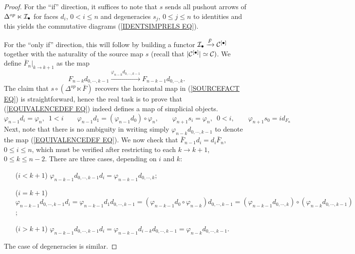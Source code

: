 \documentclass[a4paper,10pt]{article}%
\begin{document}
\begin{proof}
For the ``if'' direction, it suffices to note that $s$ sends all pushout arrows of $\Delta^{op} \ltimes \mathcal{I}_{\bullet}$ for faces $d_i$, $0<i\leq n$ and degeneracies
$s_j$, $0\leq j \leq n$ to identities
and this yields the commutative diagrams (\ref{IDENTSIMPRELS EQ}).

For the ``only if''  direction, this will follow by building a 
functor
$\mathcal{I}_{\bullet} \xrightarrow{\bar{F}} \mathcal{C}^{[\bullet]}$ together with the naturality of the source map $s$ (recall that $|\mathcal{C}^{[\bullet]}|\simeq \mathcal{C})$. We define
$\bar{F}_n|_{k \to k+1}$ as the map
\begin{equation}\label{EQUIVALENCEDEF EQ}
F_{n-k} d_{0,\cdots,k-1}
	\xrightarrow{\varphi_{n-k} d_{0,\cdots,k-1}}
F_{n-k-1} d_{0,\cdots,k}.
\end{equation}
The claim that $s \circ (\Delta^{op} \ltimes \bar{F})$ recovers the horizontal map in (\ref{SOURCEFACT EQ}) is straightforward, hence the real task is to prove that (\ref{EQUIVALENCEDEF EQ}) indeed defines a map of simplicial objects.
\begin{equation}
	\varphi_{n-1}d_i = \varphi_n,\phantom{1}1<i
		\qquad
	\varphi_{n-1}d_1 = (\varphi_{n-1}d_0) \circ \varphi_n,
		\qquad
	\varphi_{n+1} s_i = \varphi_{n},\phantom{1}0<i,
		\qquad
	\varphi_{n+1} s_{0} =id_{F_{n}}
\end{equation}
Next, note that there is no ambiguity in writing simply 
$\varphi_{n-k} d_{0,\cdots,k-1}$
to denote the map (\ref{EQUIVALENCEDEF EQ}).
We now check that $\bar{F}_{n-1} d_i = d_i \bar{F}_n$, $0 \leq i \leq n$, which must be verified after restricting to each $k \to k+1$, $0\leq k \leq n-2$. There are three cases, depending on $i$ and $k$:
\begin{itemize}
	\item[($i <k+1$)] 
	$\varphi_{n-k-1} d_{0,\cdots,k-1} d_i =
	\varphi_{n-k-1} d_{0,\cdots,k}$;
	\item[($i=k+1$)] 
	$\varphi_{n-k-1} d_{0,\cdots,k-1} d_i =
	\varphi_{n-k-1} d_1 d_{0,\cdots,k-1}=
	(\varphi_{n-k-1} d_0 \circ \varphi_{n-k})d_{0,\cdots,k-1}=
	(\varphi_{n-k-1}d_{0,\cdots,k})\circ(\varphi_{n-k}d_{0,\cdots,k-1})
	$;
	\item[($i>k+1$)] 
	$\varphi_{n-k-1} d_{0,\cdots,k-1} d_i =
	\varphi_{n-k-1} d_{i-k} d_{0,\cdots,k-1} =
	\varphi_{n-k}d_{0,\cdots,k-1}$.
\end{itemize}
The case of degeneracies is similar.
\end{proof}
\end{document}
